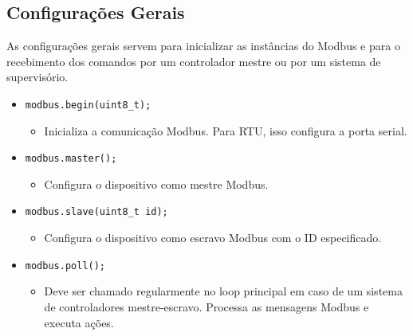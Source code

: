 \subsection{Configurações Gerais}
As configurações gerais servem para inicializar as instâncias do Modbus e para o recebimento dos comandos por um controlador mestre ou por um sistema de supervisório. 
\begin{itemize}
    \item \texttt{modbus.begin(uint8\_t);}
    \begin{itemize}
        \item Inicializa a comunicação Modbus. Para RTU, isso configura a porta serial.
    \end{itemize}
    \item \texttt{modbus.master();}
    \begin{itemize}
        \item Configura o dispositivo como mestre Modbus.
    \end{itemize}
    \item \texttt{modbus.slave(uint8\_t id);}
    \begin{itemize}
        \item Configura o dispositivo como escravo Modbus com o ID especificado.
    \end{itemize}
    \item \texttt{modbus.poll();}
    \begin{itemize}
        \item Deve ser chamado regularmente no loop principal em caso de um sistema de controladores mestre-escravo. Processa as mensagens Modbus e executa ações.
    \end{itemize}
\end{itemize}

